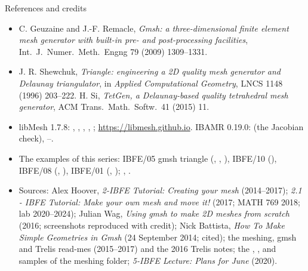 \documentclass[aspectratio=169,11pt]{beamer}
\begin{document}
\begin{frame}{References and credits}
\label{fr:refs}
\scriptsize
\begin{itemize}
  \item C. Geuzaine and J.-F. Remacle, \emph{Gmsh: a three-dimensional finite element mesh generator with built-in pre- and post-processing facilities}, Int.\ J.\ Numer.\ Meth.\ Engng 79 (2009) 1309--1331.
  \item J. R. Shewchuk, \emph{Triangle: engineering a 2D quality mesh generator and Delaunay triangulator}, in \emph{Applied Computational Geometry}, LNCS 1148 (1996) 203--222. H. Si, \emph{TetGen, a Delaunay-based quality tetrahedral mesh generator}, ACM Trans.\ Math.\ Softw.\ 41 (2015) 11.
  \item libMesh 1.7.8: , , , , ; \url{https://libmesh.github.io}. IBAMR 0.19.0:  (the Jacobian check), --.
  \item The examples of this series: IBFE/05 gmsh triangle (, , ), IBFE/10 (), IBFE/08 (, ), IBFE/01  (, ); , .
  \item Sources: Alex Hoover, \emph{2-IBFE Tutorial: Creating your mesh} (2014--2017); \emph{2.1 - IBFE Tutorial: Make your own mesh and move it!} (2017; MATH 769 2018; lab 2020--2024); Julian Wag, \emph{Using gmsh to make 2D meshes from scratch} (2016; screenshots reproduced with credit); Nick Battista, \emph{How To Make Simple Geometries in Gmsh} (24 September 2014; cited); the meshing, gmsh and Trelis read-mes (2015--2017) and the 2016 Trelis notes; the , ,  and   samples of the meshing folder; \emph{5-IBFE Lecture: Plans for June} (2020).
\end{itemize}
\end{frame}
\end{document}
